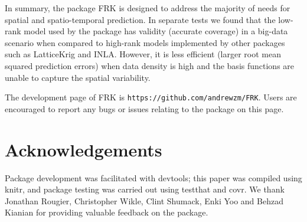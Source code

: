 \documentclass{article}\usepackage[]{graphicx}\usepackage[]{color}
\let\code=\texttt
\newcommand{\pkg}[1]{{\fontseries{b}\selectfont #1}}
\begin{document}
In summary, the package \pkg{FRK} is designed to address the majority of needs for spatial and spatio-temporal prediction. In separate tests we found that the low-rank model used by the package has validity (accurate coverage) in a big-data scenario when compared to high-rank models implemented by other packages such as \pkg{LatticeKrig} and \pkg{INLA}. However, it is less efficient (larger root mean squared prediction errors) when data density is high and the basis functions are unable to capture the spatial variability.

The development page of \pkg{FRK} is \code{https://github.com/andrewzm/FRK}. Users are encouraged to report any bugs or issues relating to the package on this page.


\section*{Acknowledgements}

Package development was facilitated with \pkg{devtools}; this paper was compiled using \pkg{knitr}, and package testing was carried out using \pkg{testthat} and \pkg{covr}. We thank Jonathan Rougier, Christopher Wikle, Clint Shumack, Enki Yoo and Behzad Kianian for providing valuable feedback on the package.
\end{document}
